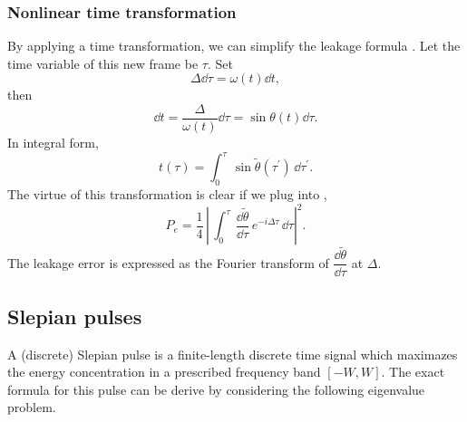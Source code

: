 \subsubsection{Nonlinear time transformation}
By applying a time transformation, we can simplify the leakage formula .
Let the time variable of this new frame be $\tau$. Set
$$
  \Delta \dd \tau = \omega(t) \dd t,
$$
then
\begin{equation}
  \dd t = \dfrac{\Delta}{\omega(t)}\dd \tau = \sin \theta(t) \dd \tau.
  \label{eq:nonlinear_time_transform_differential}
\end{equation}
In integral form,
\begin{equation}
  t(\tau) = \int_0^\tau\,\sin\tilde{\theta}(\tau^\prime)\,\dd\tau^\prime.
  \label{eq:nonliniear_time_transform}
\end{equation}
The virtue of this transformation is clear if we plug  into ,
\begin{equation}
  P_e = \dfrac{1}{4}\, \left\lvert\, \int_0^\tau\,\dfrac{\dd\tilde{\theta}}{\dd\tau}\, e^{-i\Delta \tau}\,\dd \tau \right\rvert^2.
  \label{eq:leakage_tau}
\end{equation}
The leakage error is expressed as the Fourier transform of $\dfrac{\dd\tilde{\theta}}{\dd \tau}$
at $\Delta$.


\subsection{Slepian pulses}
\label{subsec:slepian_pulses}


A (discrete) Slepian pulse is a finite-length discrete time signal which maximazes the energy concentration in a prescribed
frequency band $[-W,W]$.
The exact formula for this pulse can be derive by considering the following eigenvalue problem.


